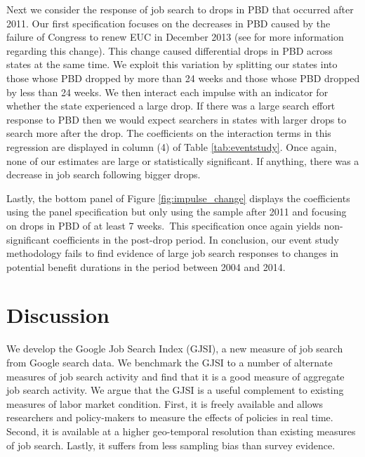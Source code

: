 \documentclass[12pt]{article}
\begin{document}
\begin{spacing}{2}
Next we consider the response of job search to drops in PBD that occurred after 2011. Our first specification focuses on the decreases in PBD caused by the failure of Congress to renew EUC in December 2013 (see \citet{hagedornimpact2015} for more information regarding this change). This change caused differential drops in PBD across states at the same time. We exploit this variation by splitting our states into those whose PBD dropped by more than 24 weeks and those whose PBD dropped by less than 24 weeks. We then interact each impulse with an indicator for whether the state experienced a large drop. If there was a large search effort response to PBD then we would expect searchers in states with larger drops to search more after the drop. The coefficients on the interaction terms in this regression are displayed in column (4) of Table \ref{tab:eventstudy}. Once again, none of our estimates are large or statistically significant. If anything, there was a decrease in job search following bigger drops.

Lastly, the bottom panel of Figure \ref{fig:impulse_change} displays the coefficients using the panel specification but only using the sample after 2011 and focusing on drops in PBD of at least 7 weeks.\footnotemark \ This specification once again yields non-significant coefficients in the post-drop period. In conclusion, our event study methodology fails to find evidence of large job search responses to changes in potential benefit durations in the period between 2004 and 2014. 



\section{Discussion}
We develop the Google Job Search Index (GJSI), a new measure of job search from Google search data. We benchmark the GJSI to a number of alternate measures of job search activity and find that it is a good measure of aggregate job search activity. We argue that the GJSI is a useful complement to existing measures of labor market condition. First, it is freely available and allows researchers and policy-makers to measure the effects of policies in real time. Second, it is available at a higher geo-temporal resolution than existing measures of job search. Lastly, it suffers from less sampling bias than survey evidence.


\end{spacing}
\end{document}
